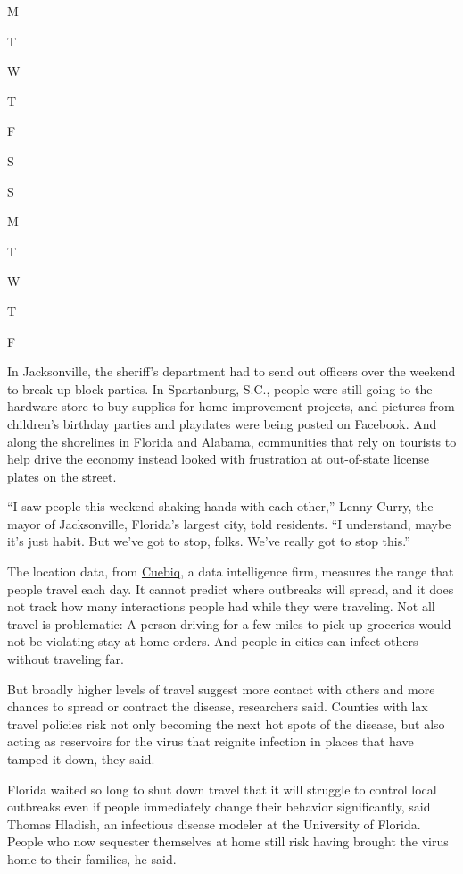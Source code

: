 M

T

W

T

F

S

S

M

T

W

T

F

In Jacksonville, the sheriff's department had to send out officers over
the weekend to break up block parties. In Spartanburg, S.C., people were
still going to the hardware store to buy supplies for home-improvement
projects, and pictures from children's birthday parties and playdates
were being posted on Facebook. And along the shorelines in Florida and
Alabama, communities that rely on tourists to help drive the economy
instead looked with frustration at out-of-state license plates on the
street.

``I saw people this weekend shaking hands with each other,'' Lenny
Curry, the mayor of Jacksonville, Florida's largest city, told
residents. ``I understand, maybe it's just habit. But we've got to stop,
folks. We've really got to stop this.''

The location data, from
\href{https://www.cuebiq.com/visitation-insights-covid19/?utm_source=nyt\&utm_medium=article\&utm_campaign=organic}{Cuebiq},
a data intelligence firm, measures the range that people travel each
day. It cannot predict where outbreaks will spread, and it does not
track how many interactions people had while they were traveling. Not
all travel is problematic: A person driving for a few miles to pick up
groceries would not be violating stay-at-home orders. And people in
cities can infect others without traveling far.

But broadly higher levels of travel suggest more contact with others and
more chances to spread or contract the disease, researchers said.
Counties with lax travel policies risk not only becoming the next hot
spots of the disease, but also acting as reservoirs for the virus that
reignite infection in places that have tamped it down, they said.

Florida waited so long to shut down travel that it will struggle to
control local outbreaks even if people immediately change their behavior
significantly, said Thomas Hladish, an infectious disease modeler at the
University of Florida. People who now sequester themselves at home still
risk having brought the virus home to their families, he said.

